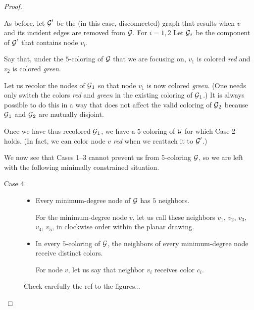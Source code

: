 {\begin{proof}
\begin{description}
As before, let $\mbox{$\cal G$}'$ be the (in this case, disconnected) graph that
results when $v$ and its incident edges are removed from $\mbox{$\cal G$}$.  For $i
= 1,2$ Let $\mbox{$\cal G$}_i$ be the component of $\mbox{$\cal G$}'$ that contains node $v_i$.

Say that, under the $5$-coloring of $\mbox{$\cal G$}$ that we are focusing on,
$v_1$ is colored {\it red} and $v_2$ is colored {\it green}.

Let us recolor the nodes of $\mbox{$\cal G$}_1$ so that node $v_1$ is now colored
{\it green}.  (One needs only switch the colors {\it red} and {\it
  green} in the existing coloring of $\mbox{$\cal G$}_1$.)  It is always possible
to do this in a way that does not affect the valid coloring of $\mbox{$\cal G$}_2$
because $\mbox{$\cal G$}_1$ and $\mbox{$\cal G$}_2$ are mutually disjoint.

Once we have thus-recolored $\mbox{$\cal G$}_1$, we have a $5$-coloring of $\mbox{$\cal G$}$ for
which Case 2 holds.  (In fact, we can color node $v$ {\em red} when we
reattach it to $\mbox{$\cal G$}'$.)
\end{description}

\noindent
We now see that Cases 1--3 cannot prevent us from $5$-coloring $\mbox{$\cal G$}$, so
we are left with the following minimally constrained situation.
\begin{description}
\item[{\sf Case 4}.]
\begin{itemize}
\item
Every minimum-degree node of $\mbox{$\cal G$}$ has $5$ neighbors.

For the minimum-degree node $v$, let us call these neighbors $v_1$,
$v_2$, $v_3$, $v_4$, $v_5$, in clockwise order within the planar
drawing.
\item
In every $5$-coloring of $\mbox{$\cal G$}$, the neighbors of every minimum-degree
node receive distinct colors.

For node $v$, let us say that neighbor $v_i$ receives color $c_i$.
\end{itemize}
{\Denis Check carefully the ref to the figures...}


\end{description}
\end{proof}}
